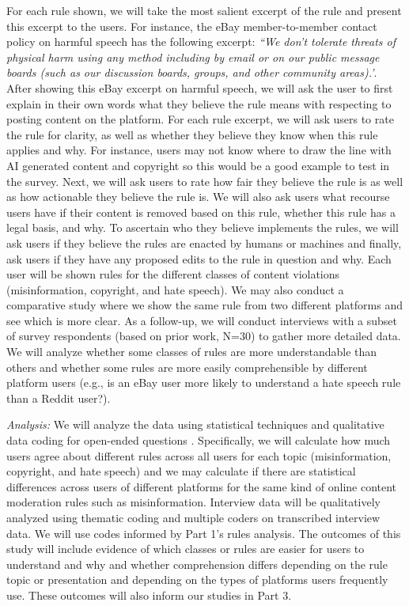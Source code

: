 For each rule shown, we will take the most salient excerpt of the rule and present this excerpt to the users. For instance, 
the eBay member-to-member contact policy on harmful speech has the following excerpt: \textit{``We don't tolerate threats of physical harm using any method including by email or on our public message boards (such as our discussion boards, groups, and other community areas).'}. After showing this eBay excerpt on harmful speech, we will
ask the user to first explain in their own words what they believe the rule
means with respecting to posting content on the platform. For each rule excerpt, we will ask users to rate the rule for clarity, as well as whether they believe they know when this rule applies and why. For instance, users may not know where to draw the line with AI generated content and copyright so this would be a good example to test in the survey. Next, we will ask users to rate how fair they believe the rule is
as well as how actionable they believe the rule is. We will also ask users what recourse users have if their content is removed based on this rule, whether this rule has a legal basis, and why. To ascertain who they believe implements the rules, we will ask users if they
believe the rules are enacted by humans or machines and finally, ask users if
they have any proposed edits to the rule in question and why. Each user will
be shown rules for the different classes of content violations
(misinformation, copyright, and hate speech). We may also conduct a comparative study where we show the same rule from two different platforms and see which is more clear. As a follow-up, we will conduct interviews with a subset of survey respondents (based on prior work, N=30) to gather more detailed data. We will analyze whether some
classes of rules are more understandable than others and whether some rules
are more easily comprehensible by different platform users (e.g., is an eBay
user more likely to understand a hate speech rule than a Reddit user?).


\textit{Analysis:} We will analyze the data using statistical techniques and qualitative data coding for open-ended questions \cite{lazar2017research}. %
Specifically, we will calculate how much users agree about different rules across all users for each topic (misinformation, copyright, and hate speech) and we may calculate if there are statistical differences across users of different platforms for the same kind of online content moderation rules such as misinformation. Interview data will be qualitatively analyzed using thematic coding and multiple coders on transcribed interview data. We will use codes informed by Part 1's rules analysis. The outcomes of this study will include evidence of which classes or rules are easier for users to understand and why and whether comprehension differs depending on the rule topic or presentation and depending on the types of platforms users frequently use. These outcomes will also inform our studies in Part 3.



